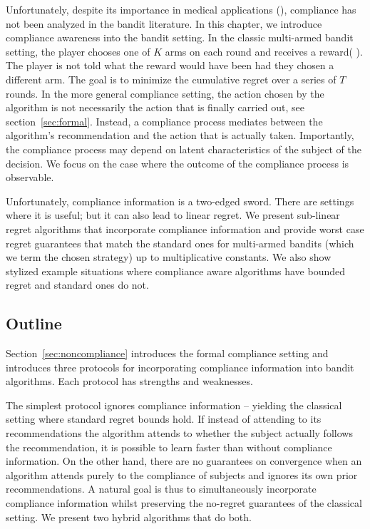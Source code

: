 Unfortunately, despite its importance in medical applications (\cite{vrijens:12,hugtenburg:13}), compliance has not been analyzed in the bandit literature.
In this chapter, we introduce compliance awareness into the bandit setting.
In the classic multi-armed bandit setting, the player chooses one of $K$ arms on each round and receives a reward( \cite{auer:02b,auer:02}). The player is not told what the reward would have been had they chosen a different arm. The goal is to minimize the cumulative regret over a series of $T$ rounds. In the more general compliance setting, the action chosen by the algorithm is not necessarily the action that is finally carried out, see section~\ref{sec:formal}. Instead, a compliance process mediates between the algorithm's recommendation and the action that is actually taken. Importantly, the compliance process may depend on latent characteristics of the subject of the decision. We focus on the case where the outcome of the compliance process is observable.

Unfortunately, compliance information is a two-edged sword. There are settings where it is useful; but  it can also lead to linear regret. We present sub-linear regret algorithms that incorporate compliance information and provide worst case regret guarantees that match the standard ones for multi-armed bandits (which we term the chosen strategy) up to multiplicative constants. We also show stylized example situations where compliance aware algorithms have bounded regret and standard ones do not.


\subsection{Outline}
Section~\ref{sec:noncompliance} introduces the formal compliance setting and introduces three protocols for incorporating compliance information into bandit algorithms. Each protocol has strengths and weaknesses.

The simplest protocol ignores compliance information -- yielding the classical setting where standard regret bounds hold. If instead of attending to its recommendations the algorithm attends to whether the subject actually follows the recommendation, it is possible to learn faster than without compliance information. On the other hand, there are no guarantees on convergence when an algorithm attends purely to the compliance of subjects and ignores its own prior recommendations. A natural goal is thus to simultaneously incorporate compliance information whilst preserving the no-regret guarantees of the classical setting. We present two hybrid algorithms that do both.


